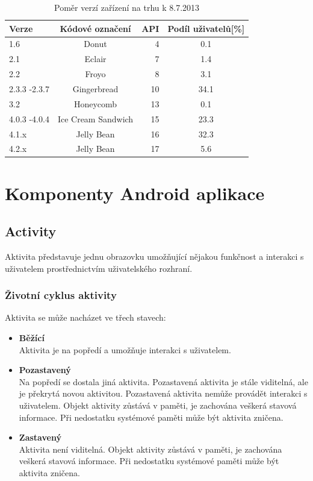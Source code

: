 \documentclass{diplomka}
\begin{document}
\begin{table}[H]\footnotesize
\begin{center}
  \begin{tabular}{| l | c | r | c |}
    \hline
Verze&Kódové označení&API&Podíl uživatelů[\%]\\ \hline
  1.6&Donut&4&0.1\\ \hline
2.1&Eclair&7&1.4\\ \hline
2.2&Froyo&8&3.1\\ \hline
2.3.3 -2.3.7&Gingerbread&10&34.1\\ \hline
3.2&Honeycomb&13&0.1\\ \hline
4.0.3 -4.0.4&Ice Cream Sandwich&15&23.3\\ \hline
4.1.x&Jelly Bean&16&32.3\\ \hline
4.2.x&Jelly Bean&17&5.6\\ \hline
  \end{tabular}
\end{center}
\caption{Poměr verzí zařízení na trhu k 8.7.2013\cite{share}}
\label{tab:share}
\end{table}



\section{Komponenty Android aplikace}

\subsection{Activity}
Aktivita představuje jednu obrazovku umožňující nějakou funkčnost a interakci s uživatelem prostřednictvím uživatelského rozhraní. 

\subsubsection*{Životní cyklus aktivity}
Aktivita se může nacházet ve třech stavech:

\begin{itemize}[]
\item \textbf{Běžící}\\
Aktivita je na popředí a umožňuje interakci s uživatelem.
\item \textbf{Pozastavený}\\
Na popředí se dostala jiná aktivita. Pozastavená aktivita je stále viditelná, ale je překrytá novou aktivitou. Pozastavená aktivita nemůže provádět interakci s uživatelem. Objekt aktivity zůstává v paměti, je zachována veškerá stavová informace. Při nedostatku systémové paměti může být aktivita zničena.
\item \textbf{Zastavený}\\
Aktivita není viditelná. Objekt aktivity zůstává v paměti, je zachována veškerá stavová informace. Při nedostatku systémové paměti může být aktivita zničena.
\end{itemize}
\end{document}

